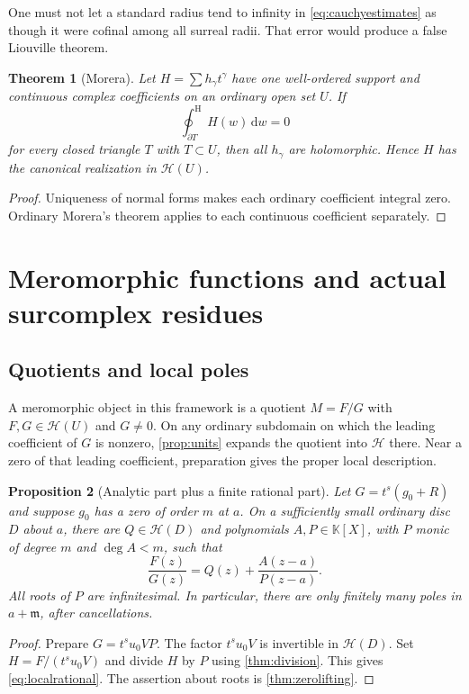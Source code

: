 \documentclass[11pt,letterpaper]{article}
\numberwithin{equation}{section}
\newtheorem{theorem}{Theorem}[section]
\newtheorem{proposition}[theorem]{Proposition}
\theoremstyle{definition}
\theoremstyle{remark}
\newcommand{\K}{\mathbb{K}}
\newcommand{\mm}{\mathfrak{m}}
\newcommand{\HH}{\mathcal{H}}
\newcommand{\dd}{\,\mathrm{d}}
\newcommand{\cooint}{\mathop{\oint}\nolimits^{\mathrm H}}
\begin{document}
One must not let a standard radius tend to infinity in
\eqref{eq:cauchyestimates} as though it were cofinal among all surreal
radii. That error would produce a false Liouville theorem.

\begin{theorem}[Morera]\label{thm:morera}
Let $H=\sum h_\gamma t^\gamma$ have one well-ordered support and continuous
complex coefficients on an ordinary open set $U$. If
\[
 \cooint_{\partial T}H(w)\dd w=0
\]
for every closed triangle $T$ with $T\subset U$, then all $h_\gamma$ are
holomorphic. Hence $H$ has the canonical realization in $\HH(U)$.
\end{theorem}
\begin{proof}
Uniqueness of normal forms makes each ordinary coefficient integral zero.
Ordinary Morera's theorem applies to each continuous coefficient separately.
\end{proof}

\section{Meromorphic functions and actual surcomplex residues}\label{sec:residues}

\subsection{Quotients and local poles}

A meromorphic object in this framework is a quotient $M=F/G$ with
$F,G\in\HH(U)$ and $G\ne0$. On any ordinary subdomain on which the leading
coefficient of $G$ is nonzero, \cref{prop:units} expands the quotient into
$\HH$ there. Near a zero of that leading coefficient, preparation gives the
proper local description.

\begin{proposition}[Analytic part plus a finite rational part]\label{prop:localrational}
Let $G=t^s(g_0+R)$ and suppose $g_0$ has a zero of order $m$ at $a$.
On a sufficiently small ordinary disc $D$ about $a$, there are
$Q\in\HH(D)$ and polynomials $A,P\in\K[X]$, with $P$ monic of degree $m$
and $\deg A<m$, such that
\begin{equation}\label{eq:localrational}
 \frac{F(z)}{G(z)}=Q(z)+\frac{A(z-a)}{P(z-a)}.
\end{equation}
All roots of $P$ are infinitesimal. In particular, there are only finitely
many poles in $a+\mm$, after cancellations.
\end{proposition}
\begin{proof}
Prepare $G=t^s u_0 V P$. The factor $t^s u_0V$ is invertible in $\HH(D)$.
Set $H=F/(t^s u_0V)$ and divide $H$ by $P$ using
\cref{thm:division}. This gives \eqref{eq:localrational}. The assertion about
roots is \cref{thm:zerolifting}.
\end{proof}
\end{document}
